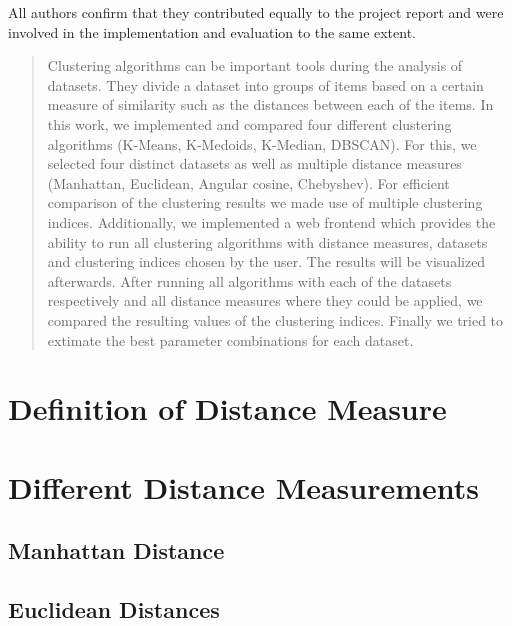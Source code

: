 \documentclass[12pt, english]
{article}
\begin{document}
\newpage%
All authors confirm that they contributed equally to the project report and were involved in the implementation and evaluation to the same extent.
\newpage 

\begin{abstract}
Clustering algorithms can be important tools during the analysis of datasets. They divide a dataset into groups of items based on a certain measure of similarity such as the distances between each of the items. 
In this work, we implemented and compared four different clustering algorithms (K-Means, K-Medoids, K-Median, DBSCAN). For this, we selected four distinct datasets as well as multiple distance measures (Manhattan, Euclidean, Angular cosine, Chebyshev). For efficient comparison of the clustering results we made use of multiple clustering indices. Additionally, we implemented a web frontend which provides the ability to run all clustering algorithms with distance measures, datasets and clustering indices chosen by the user. The results will be visualized afterwards.
After running all algorithms with each of the datasets respectively and all distance measures where they could be applied, we compared the resulting values of the clustering indices.
Finally we tried to extimate the best parameter combinations for each dataset.

\end{abstract}

\newpage

\tableofcontents

\newpage


\section{Definition of Distance Measure}
\label{def_DM}

\section{Different Distance Measurements} \label{distances}
\subsection{Manhattan Distance}

\subsection{Euclidean Distances}

\end{document}
